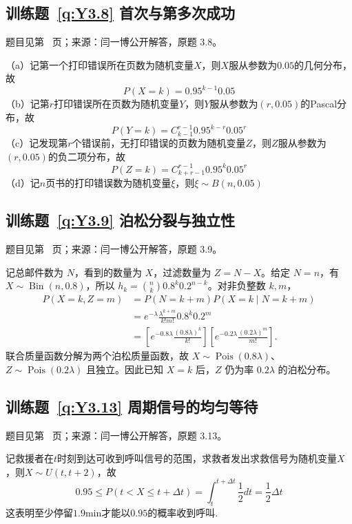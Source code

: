 \documentclass[UTF8,12pt,a4paper,fontset=fandol]{ctexbook}
\begin{document}
\subsection*{训练题~\ref{q:Y3.8} 首次与第多次成功}\label{a:Y3.8}{\small 题目见第~\pageref{q:Y3.8} 页；来源：闫一博公开解答，原题 3.8。}
\begin{solve}
（a）记第一个打印错误所在页数为随机变量$X$，则$X$服从参数为$0.05$的几何分布，故
\[P(X=k)=0.95^{k-1} 0.05\]
（b）记第$r$打印错误所在页数为随机变量$Y$，则$Y$服从参数为$(r,0.05)$的Pascal分布，故
\[P(Y = k) = C_{k - 1}^{r - 1}{0.95^{k - r}}{0.05^r}\]
（c）记发现第$r$个错误前，无打印错误的页数为随机变量$Z$，则$Z$服从参数为$(r,0.05)$的负二项分布，故 
\[P(Z = k) = C_{k + r - 1}^{r - 1}{0.95^k}{0.05^r}\]
（d）记$n$页书的打印错误数为随机变量$\xi$，则$\xi\sim B(n,0.05)$
\end{solve}

\subsection*{训练题~\ref{q:Y3.9} 泊松分裂与独立性}\label{a:Y3.9}{\small 题目见第~\pageref{q:Y3.9} 页；来源：闫一博公开解答，原题 3.9。}
\begin{solve}记总邮件数为 $N$，看到的数量为 $X$，过滤数量为 $Z=N-X$。给定 $N=n$，有 $X\sim\operatorname{Bin}(n,0.8)$，所以 $h_k=\binom nk0.8^k0.2^{n-k}$。对非负整数 $k,m$，\[\begin{aligned}P(X=k,Z=m)&=P(N=k+m)P(X=k\mid N=k+m)\\&=e^{-\lambda}\frac{\lambda^{k+m}}{k!m!}0.8^k0.2^m\\&=\left[e^{-0.8\lambda}\frac{(0.8\lambda)^k}{k!}\right]\left[e^{-0.2\lambda}\frac{(0.2\lambda)^m}{m!}\right].\end{aligned}\]联合质量函数分解为两个泊松质量函数，故 $X\sim\operatorname{Pois}(0.8\lambda)$、$Z\sim\operatorname{Pois}(0.2\lambda)$ 且独立。因此已知 $X=k$ 后，$Z$ 仍为率 $0.2\lambda$ 的泊松分布。\end{solve}

\subsection*{训练题~\ref{q:Y3.13} 周期信号的均匀等待}\label{a:Y3.13}{\small 题目见第~\pageref{q:Y3.13} 页；来源：闫一博公开解答，原题 3.13。}
\begin{solve}
记救援者在$t$时刻到达可收到呼叫信号的范围，求救者发出求救信号为随机变量$X$，则$X\sim U(t,t+2)$，故
\[0.95 \leqslant P(t < X \leqslant t + \Delta t) = \int_t^{t + \Delta t} {\frac{1}{2}dt}  = \frac{1}{2}\Delta t\]
这表明至少停留$1.9$min才能以$0.95$的概率收到呼叫.
\end{solve}
\end{document}
